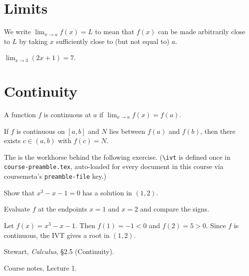 \documentclass[
	unit   = Lecture,
	number = 1,
	title  = {Limits and Continuity},
]{didactic}
\begin{document}
\maketitle

\section{Limits}

\begin{definition}[Limit]
	We write $\lim_{x \to a} f(x) = L$ to mean that $f(x)$ can be
	made arbitrarily close to $L$ by taking $x$ sufficiently close
	to (but not equal to) $a$.
\end{definition}

\begin{example}
	$\displaystyle \lim_{x \to 3} (2x + 1) = 7$.
\end{example}

\section{Continuity}

\begin{definition}
	A function $f$ is continuous at $a$ if
	$\lim_{x \to a} f(x) = f(a)$.
\end{definition}

\begin{theorem}
	If $f$ is continuous on $[a, b]$ and $N$ lies between $f(a)$
	and $f(b)$, then there exists $c \in (a, b)$ with $f(c) = N$.
\end{theorem}

The \ivt{} is the workhorse behind the following exercise. (\texttt{\textbackslash ivt}
is defined once in \texttt{course-preamble.tex}, auto-loaded for every document in
this course via coursemeta's \texttt{preamble-file} key.)

\begin{exercise}
	Show that $x^3 - x - 1 = 0$ has a solution in $(1, 2)$.
\end{exercise}

\hint Evaluate $f$ at the endpoints $x = 1$ and $x = 2$ and compare the signs.

\begin{solution}[2in]
	Let $f(x) = x^3 - x - 1$. Then $f(1) = -1 < 0$ and
	$f(2) = 5 > 0$. Since $f$ is continuous, the IVT gives a root
	in $(1, 2)$.
\end{solution}

\begin{readings}
	\item Stewart, \emph{Calculus}, \S2.5 (Continuity).
	\item Course notes, Lecture 1.
\end{readings}
\end{document}
